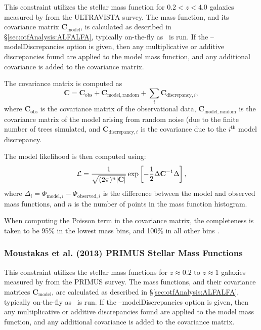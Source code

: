 This constraint utilizes the stellar mass function for $0.2 < z< 4.0$ galaxies measured by \cite{muzzin_evolution_2013} from the ULTRAVISTA survey. The mass function, and its covariance matrix $\mathbf{C}_\mathrm{model}$, is calculated as described in \S\ref{sec:otfAnalysis:ALFALFA}, typically on-the-fly as \glc\ is run. If the {\normalfont \ttfamily --modelDiscrepancies} option is given, then any multiplicative or additive discrepancies found are applied to the model mass function, and any additional covariance is added to the covariance matrix.

The covariance matrix is computed as
\begin{equation}
 \mathbf{C} = \mathbf{C}_\mathrm{obs} + \mathbf{C}_\mathrm{model,random} + \sum_i \mathbf{C}_{\mathrm{discrepancy}, i},
\end{equation}
where $\mathbf{C}_\mathrm{obs}$ is the covariance matrix of the observational data, $\mathbf{C}_\mathrm{model,random}$ is the covariance matrix of the model arising from random noise (due to the finite number of trees simulated, and $\mathbf{C}_{\mathrm{discrepancy}, i}$ is the covariance due to the $i^\mathrm{th}$ model discrepancy.

The model likelihood is then computed using:
\begin{equation}
 \mathcal{L} = {1 \over \sqrt{(2 \pi)^n |\mathbf{C}|}} \exp\left[ -{1\over 2} \Delta \mathbf{C}^{-1} \Delta \right],
\end{equation}
where $\Delta_i = \Phi_{\mathrm{model}, i} - \Phi_{\mathrm{observed}, i}$ is the difference between the model and observed mass functions, and $n$ is the number of points in the mass function histogram.

When computing the Poisson term in the covariance matrix, the completeness is taken to be 95\% in the lowest mass bins, and 100\% in all other bins \citep{muzzin_evolution_2013}.

\subsubsection{Moustakas et al. (2013) PRIMUS Stellar Mass Functions}\label{sec:AnalysisMoustakasPRIMUSSStellarMassFunctions}

This constraint utilizes the stellar mass functions for $z\approx 0.2$ to $z\approx 1$ galaxies measured by \cite{moustakas_primus:_2013} from the PRIMUS survey. The mass functions, and their covariance matrices $\mathbf{C}_\mathrm{model}$, are calculated as described in \S\ref{sec:otfAnalysis:ALFALFA}, typically on-the-fly as \glc\ is run. If the {\normalfont \ttfamily --modelDiscrepancies} option is given, then any multiplicative or additive discrepancies found are applied to the model mass function, and any additional covariance is added to the covariance matrix.

